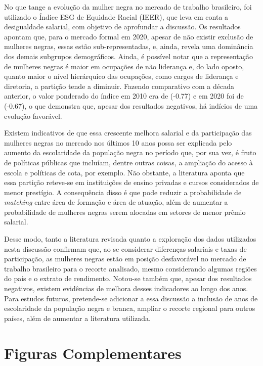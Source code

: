 \documentclass[12pt]{article}
\begin{document}
\par No que tange a evolução da mulher negra no mercado de trabalho brasileiro, foi utilizado o Índice ESG de Equidade Racial (IEER), que leva em conta a desigualdade salarial, com objetivo de aprofundar a discussão. Os resultados apontam que, para o mercado formal em 2020,  apesar de não existir exclusão de mulheres negras, essas estão sub-representadas, e, ainda, revela uma dominância dos demais subgrupos demográficos. Ainda, é possível notar que a representação de mulheres negras é maior em ocupações de não liderança e, do lado oposto, quanto maior o nível hierárquico das ocupações, como cargos de liderança e diretoria, a partição tende a diminuir. Fazendo comparativo com a década anterior, o valor ponderado do índice em 2010 era de (-0.77) e em 2020 foi de (-0.67), o que demonstra que, apesar dos resultados negativos,  há indícios de uma evolução favorável. \par Existem indicativos de que essa crescente melhora salarial e da participação das mulheres negras no mercado nos últimos 10 anos possa ser explicada pelo aumento da escolaridade da população negra no período que, por sua vez, é fruto de políticas públicas que incluíam, dentre  outras coisas, a ampliação do acesso à escola e políticas de cota, por exemplo. Não obstante, a literatura aponta que essa partição reteve-se em instituições de ensino privadas e cursos considerados de menor prestígio. A consequência disso é que pode reduzir a probabilidade de \textit{matching} entre área de formação e área de atuação, além de aumentar a probabilidade de mulheres negras serem alocadas em setores de menor prêmio salarial.
\par Desse modo, tanto a literatura revisada quanto a exploração dos dados utilizados nesta discussão confirmam que, ao se considerar diferenças salariais e taxas de participação, as mulheres negras estão em posição desfavorável no mercado de trabalho brasileiro para o recorte analisado, mesmo considerando algumas regiões do país e o extrato de rendimento. Notou-se também que, apesar dos resultados negativos, existem evidências de melhora desses indicadores ao longo dos anos. Para estudos futuros, pretende-se adicionar a essa discussão a inclusão de anos de escolaridade da população negra e branca, ampliar o recorte regional para outros países, além de aumentar a literatura utilizada.

\clearpage

\appendix

\section*{Figuras Complementares} \label{fig_comp}
\end{document}
